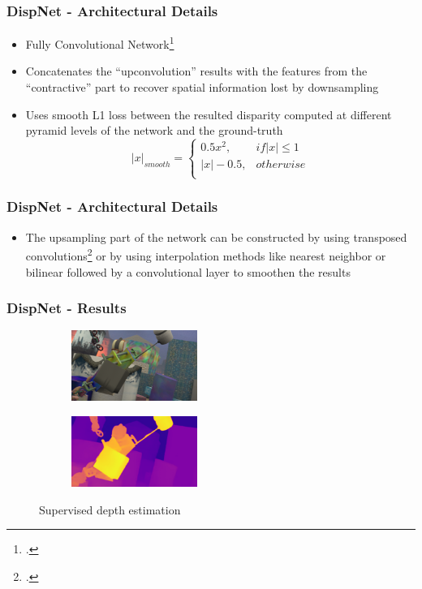 \documentclass{beamer}
\begin{document}
\begin{frame}
\frametitle{DispNet - Architectural Details}
\center
\begin{itemize}
	\item Fully Convolutional Network\footcite{DBLP:journals/corr/LongSD14}
	\item Concatenates the ``upconvolution'' results with the features from the ``contractive'' part to recover spatial information lost by downsampling
	\item Uses smooth L1 loss between the resulted disparity computed at different pyramid levels of the network and the ground-truth
	\[
	\lvert x \rvert _{smooth}=
	\begin{cases}
	0.5x^2, & if \lvert x \rvert \leq 1\\
	\lvert x \rvert -0.5, & otherwise\\
	\end{cases}
	\]
\end{itemize}
\end{frame}

\begin{frame}
\frametitle{DispNet - Architectural Details}
\center
\begin{itemize}
	\item The upsampling part of the network can be constructed by using transposed convolutions\footcite{Zeiler:2011:ADN:2355573.2356530} or by using interpolation methods like nearest neighbor or bilinear followed by a convolutional layer to smoothen the results
\end{itemize}
\end{frame}

\begin{frame}
\frametitle{DispNet - Results}
\center
\begin{figure}
	\centering
	\begin{subfigure}
		\centering
    	\includegraphics[width=0.45\textwidth]{original_depth.png}
    \end{subfigure}
    \begin{subfigure}
		\centering
        \includegraphics[width=0.45\textwidth]{dispnet_estimation.png}
    \end{subfigure}
    \caption{Supervised depth estimation}
\end{figure}
\end{frame}
\end{document}
